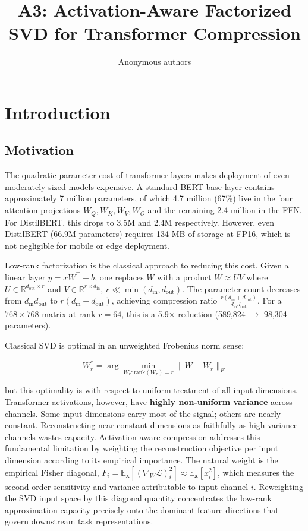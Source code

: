 \title{\textbf{A3: Activation-Aware Factorized SVD for Transformer Compression}}

\author{Anonymous authors}



\section{Introduction}

\subsection{Motivation}

The quadratic parameter cost of transformer layers makes deployment of even 
moderately-sized models expensive. A standard BERT-base layer contains 
approximately 7 million parameters, of which 4.7 million (67\%) live in the 
four attention projections $W_Q, W_K, W_V, W_O$ and the remaining 2.4 million 
in the FFN. For DistilBERT, this drops to 3.5M and 2.4M respectively. However, 
even DistilBERT (66.9M parameters) requires 134 MB of storage at FP16, which 
is not negligible for mobile or edge deployment.

Low-rank factorization is the classical approach to reducing this cost. Given 
a linear layer $y = x W^\top + b$, one replaces $W$ with a product $W \approx U V$ 
where $U \in \mathbb{R}^{d_\text{out} \times r}$ and $V \in \mathbb{R}^{r \times d_\text{in}}$, 
$r \ll \min(d_\text{in}, d_\text{out})$. The parameter count decreases from 
$d_\text{in} d_\text{out}$ to $r(d_\text{in} + d_\text{out})$, achieving 
compression ratio $\frac{r(d_\text{in} + d_\text{out})}{d_\text{in} d_\text{out}}$. 
For a $768 \times 768$ matrix at rank $r = 64$, this is a 5.9$\times$ reduction 
(589,824 $\to$ 98,304 parameters).

Classical SVD is optimal in an unweighted Frobenius norm sense:

\[
W_r^* = \arg\min_{W_r : \text{rank}(W_r) = r} \|W - W_r\|_F
\tag{1.1}
\]

but this optimality is with respect to uniform treatment of all input 
dimensions. Transformer activations, however, have \textbf{highly non-uniform 
variance} across channels. Some input dimensions carry most of the signal; 
others are nearly constant. Reconstructing near-constant dimensions as faithfully as high-variance channels wastes capacity.
Activation-aware compression addresses this fundamental limitation by weighting the reconstruction 
objective per input dimension according to its empirical importance. The natural weight is the empirical Fisher 
diagonal, $F_i = \mathbb{E}_{\mathbf{x}} [(\nabla_{W} \mathcal{L})_{i}^2] \approx \mathbb{E}_{\mathbf{x}}[x_i^2]$, 
which measures the second-order sensitivity and variance attributable to input channel $i$. 
Reweighting the SVD input space by this diagonal quantity concentrates the low-rank approximation 
capacity precisely onto the dominant feature directions that govern downstream task representations.

